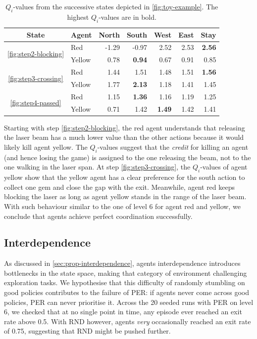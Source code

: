 \begin{table}
    \centering
    \caption{$Q_i$-values from the successive states depicted in \autoref{fig:toy-example}. The highest $Q_i$-values are in bold.}
    \label{tab:steps-qvalues}
    \begin{tabular}{c|l|rrrrr}
         \textbf{State} & \textbf{Agent} & \textbf{North} & \textbf{South} & \textbf{West} & \textbf{East} & \textbf{Stay}\\
         \hline
         \multirow{2}{*}{\ref{fig:step2-blocking}}
         & \cellcolor{red!70} Red & -1.29 & -0.97 & 2.52 & 2.53 & \textbf{2.56} \\
         & \cellcolor{yellow!70} Yellow & 0.78 & \textbf{0.94} & 0.67 & 0.91 & 0.85\\
         \hline
         \multirow{2}{*}{\ref{fig:step3-crossing}}
         & \cellcolor{red!70} Red & 1.44 & 1.51 & 1.48 & 1.51 & \textbf{1.56} \\
         & \cellcolor{yellow!70} Yellow & 1.77 & \textbf{2.13} & 1.18 & 1.41 & 1.45\\
         \hline
         \multirow{2}{*}{\ref{fig:step4-passed}}
         & \cellcolor{red!70} Red & 1.15 & \textbf{1.36} & 1.16 & 1.19 & 1.25 \\
         & \cellcolor{yellow!70} Yellow & 0.71 & 1.42 & \textbf{1.49} & 1.42 & 1.41\\
    \end{tabular}
\end{table}

Starting with step \ref{fig:step2-blocking}, the red agent understands that releasing the laser beam has a much lower value than the other actions because it would likely kill agent yellow. The $Q_i$-values suggest that the \textit{credit} for killing an agent (and hence losing the game) is assigned to the one releasing the beam, not to the one walking in the laser span.
At step \ref{fig:step3-crossing}, the $Q_{i}$-values of agent yellow show that the yellow agent has a clear preference for the south action to collect one gem and close the gap with the exit. Meanwhile, agent red keeps blocking the laser as long as agent yellow stands in the range of the laser beam. With such behaviour similar to the one of level 6 for agent red and yellow, we conclude that agents achieve perfect coordination successfully.

\subsection{Interdependence}
\label{sec:discussion-interdependence}
As discussed in \autoref{sec:prop-interdependence}, agents interdependence introduces bottlenecks in the state space, making that category of environment challenging exploration tasks. We hypothesise that this difficulty of randomly stumbling on good policies contributes to the failure of PER: if agents never come across good policies, PER can never prioritise it. Across the 20 seeded runs with PER on level 6, we checked that at no single point in time, any episode ever reached an exit rate above 0.5. With RND however, agents \emph{very} occasionally reached an exit rate of 0.75, suggesting that RND might be pushed further.


